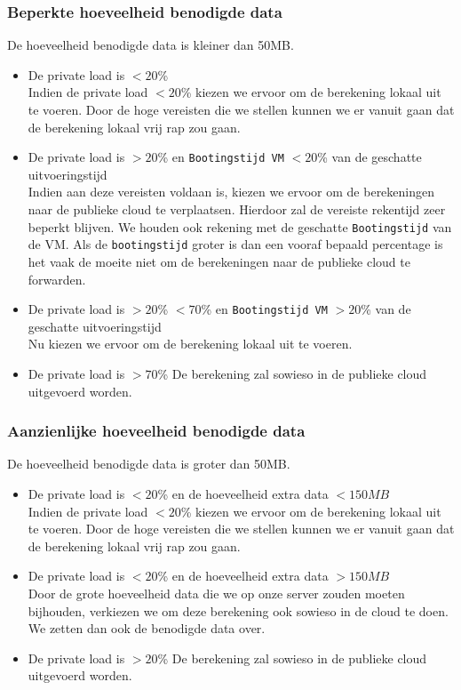 \documentclass{article}
\begin{document}
\subsubsection{Beperkte hoeveelheid benodigde data}
De hoeveelheid benodigde data is kleiner dan 50MB.
\begin{itemize}
    \item De private load is $< 20$\% \\
    Indien de private load $< 20$\% kiezen we ervoor om de berekening lokaal uit te voeren.  Door de hoge vereisten die we stellen kunnen we er vanuit gaan dat de berekening lokaal vrij rap zou gaan. 
    \newpage
    
    \item De private load is $> 20$\% en \texttt{Bootingstijd VM} $< 20$\% van de geschatte uitvoeringstijd \\
    Indien aan deze vereisten voldaan is, kiezen we ervoor om de berekeningen naar de publieke cloud te verplaatsen.  Hierdoor zal de vereiste rekentijd zeer beperkt blijven.  We houden ook rekening met de geschatte \texttt{Bootingstijd} van de VM.  Als de \texttt{bootingstijd} groter is dan een vooraf bepaald percentage is het vaak de moeite niet om de berekeningen naar de publieke cloud te forwarden.
    \item De private load is $> 20$\% $< 70$\% en \texttt{Bootingstijd VM} $> 20$\% van de geschatte uitvoeringstijd \\
    Nu kiezen we ervoor om de berekening lokaal uit te voeren.
    \item De private load is $> 70$\%
    De berekening zal sowieso in de publieke cloud uitgevoerd worden.
\end{itemize}

\subsubsection{Aanzienlijke hoeveelheid benodigde data}
De hoeveelheid benodigde data is groter dan 50MB.
\begin{itemize}
    \item De private load is $< 20$\% en de hoeveelheid extra data $< 150MB$ \\
    Indien de private load $< 20$\% kiezen we ervoor om de berekening lokaal uit te voeren.  Door de hoge vereisten die we stellen kunnen we er vanuit gaan dat de berekening lokaal vrij rap zou gaan. 
    \item De private load is $< 20$\% en de hoeveelheid extra data $> 150MB$ \\
    Door de grote hoeveelheid data die we op onze server zouden moeten bijhouden, verkiezen we om deze berekening ook sowieso in de cloud te doen.  We zetten dan ook de benodigde data over.
    \item De private load is $> 20$\%
    De berekening zal sowieso in de publieke cloud uitgevoerd worden.
\end{itemize}
    
\end{document}
